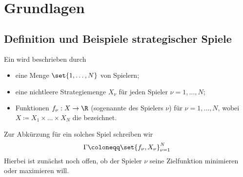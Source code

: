 \section{Grundlagen}
\subsection{Definition und Beispiele strategischer Spiele}
\begin{definition*}
  Ein  wird beschrieben durch
  \begin{itemize}
  \item  eine Menge $\set{1, \dots, N}$ von Spielern;
  \item  eine nichtleere Strategiemenge $X_{\nu}$ für jeden Spieler $\nu = 1, \dots, N$;
  \item Funktionen $f_{\nu}: X \to \R$ (sogenannte  des Spielers $\nu$) für $\nu = 1, \dots, N$, wobei $X \coloneqq X_{1} \times \dots \times X_{N}$ die  bezeichnet. 
  \end{itemize}
Zur Abkürzung für ein solches Spiel schreiben wir
\begin{align*}
  \Gamma \coloneqq \set{f_{\nu}, X_{\nu}}_{\nu = 1}^{N}
\end{align*}
Hierbei ist zunächst noch offen, ob der Spieler $\nu$ seine Zielfunktion minimieren oder maximieren will.
\end{definition*}
